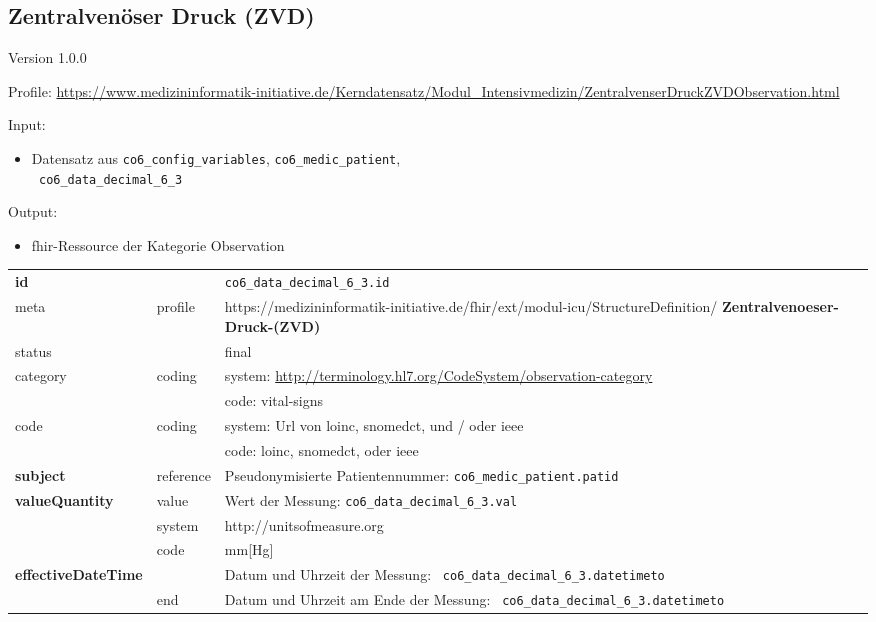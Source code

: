 \subsection{Zentralvenöser Druck (ZVD)} 
\noindent Version 1.0.0

\noindent Profile: \url{https://www.medizininformatik-initiative.de/Kerndatensatz/Modul_Intensivmedizin/ZentralvenserDruckZVDObservation.html}

\noindent Input:
\begin{itemize}
	\item Datensatz aus \texttt{co6\_config\_variables}, \texttt{co6\_medic\_patient}, \\ \texttt{
co6\_data\_decimal\_6\_3}
\end{itemize}
Output:
\begin{itemize}
        \item \ac{fhir}-Ressource der Kategorie \glqq Observation\grqq{}
\end{itemize}
\begin{longtable}{|l|l|p{7.5cm}|}
        \hline
        \rowcolor{lightgray} \multicolumn{3}{|l|}{Data Mapping (inhaltlich)} \\ \hline
        \textbf{id} &  & \texttt{co6\_data\_decimal\_6\_3.id} \\ \hline
	meta & profile & https://medizininformatik-initiative.de/fhir/ext/modul-icu/StructureDefinition/\textbf{
Zentralvenoeser-Druck-(ZVD)} \\ \hline 
	status &  & final   \\ \hline 
	category & coding & system: \url{http://terminology.hl7.org/CodeSystem/observation-category} \\
\cline{3-3}
	& & code: vital-signs \\ \hline
	code & coding & system: Url von \ac{loinc}, \ac{snomedct}, und / oder \ac{ieee} \\ 
	\cline{3-3} 
	 &  & code: \ac{loinc}, \ac{snomedct}, oder \ac{ieee} \\ \hline
	 \textbf{subject}  & reference & Pseudonymisierte Patientennummer: \texttt{co6\_medic\_patient.patid} \\ \hline
	 \textbf{valueQuantity}  & value & Wert der Messung: \texttt{co6\_data\_decimal\_6\_3.val} \\
        \cline{2-3}
         & system & http://unitsofmeasure.org \\
         \cline{2-3}
         & code & mm[Hg] \\ \hline
     \textbf{effectiveDateTime}  & & Datum und Uhrzeit der Messung: \texttt{
co6\_data\_decimal\_6\_3.datetimeto} \\
    \cline{2-3}
     & end & Datum und Uhrzeit am Ende der Messung: \texttt{
co6\_data\_decimal\_6\_3.datetimeto} \\ \hline
\end{longtable}
